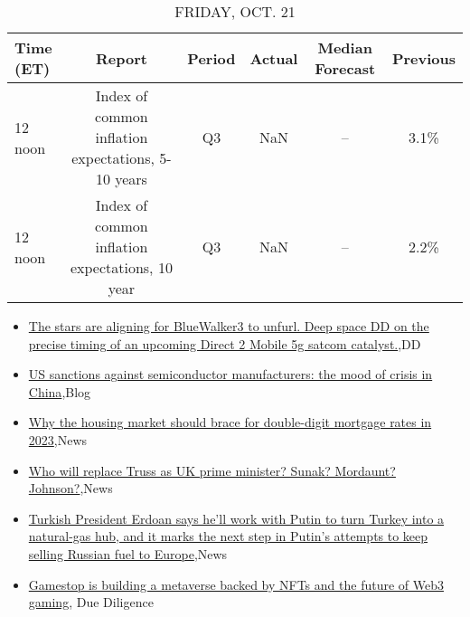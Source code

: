 \documentclass{article}%
\begin{document}
%


\begin{table}[htbp]%
\caption{FRIDAY, OCT. 21}%
\centering%
\begin{adjustbox}{width=1\textwidth}%
\begin{tabular}{lccccc}
\toprule
Time (ET) &                                             Report & Period & Actual & Median Forecast & Previous \\
\midrule
  12 noon & Index of common inflation expectations, 5-10 years &     Q3 &    NaN &              -- &     3.1\% \\
  12 noon &    Index of common inflation expectations, 10 year &     Q3 &    NaN &              -- &     2.2\% \\
\bottomrule
\end{tabular}
%
\end{adjustbox}%
\end{table}

%
\begin{itemize}%
\item%
\href{https://reddit.com/r/wallstreetbets/comments/y9tqlx/the\_stars\_are\_aligning\_for\_bluewalker3\_to\_unfurl/}{The stars are aligning for BlueWalker3 to unfurl. Deep space DD on the precise timing of an upcoming Direct 2 Mobile 5g satcom catalyst.},DD%
\item%
\href{https://reddit.com/r/Economics/comments/y9nrmj/us\_sanctions\_against\_semiconductor\_manufacturers/}{US sanctions against semiconductor manufacturers: the mood of crisis in China},Blog%
\item%
\href{https://reddit.com/r/Economics/comments/y9l13r/why\_the\_housing\_market\_should\_brace\_for/}{Why the housing market should brace for double-digit mortgage rates in 2023},News%
\item%
\href{https://reddit.com/r/Economics/comments/y9k5la/who\_will\_replace\_truss\_as\_uk\_prime\_minister\_sunak/}{Who will replace Truss as UK prime minister? Sunak? Mordaunt? Johnson?},News%
\item%
\href{https://reddit.com/r/Economics/comments/y9k1gm/turkish\_president\_erdoan\_says\_hell\_work\_with/}{Turkish President Erdoan says he'll work with Putin to turn Turkey into a natural-gas hub, and it marks the next step in Putin's attempts to keep selling Russian fuel to Europe},News%
\item%
\href{https://reddit.com/r/Superstonk/comments/y9rlkh/gamestop\_is\_building\_a\_metaverse\_backed\_by\_nfts/}{Gamestop is building a metaverse backed by NFTs and the future of Web3 gaming}, Due Diligence%
\end{itemize}%
\end{document}

